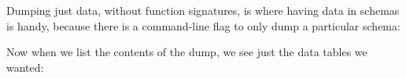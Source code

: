 \documentclass[a4paper,11pt,english]{sphinxmanual}
\begin{document}
Dumping just data, without function signatures, is where having data in schemas is handy, because there is a command-line flag to only dump a particular schema:

\begin{sphinxVerbatim}[commandchars=\\\{\}]
    
\end{sphinxVerbatim}

Now when we list the contents of the dump, we see just the data tables we wanted:
\end{document}
